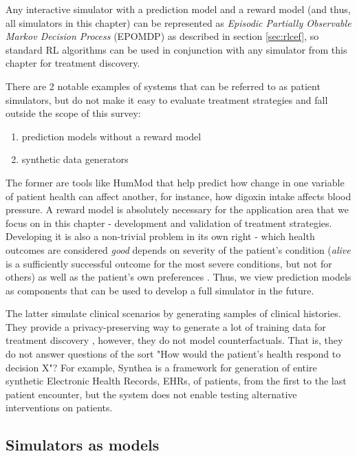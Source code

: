 Any interactive simulator with a prediction model and a reward model (and thus, all simulators in this chapter) can be represented as {\em Episodic Partially Observable Markov Decision Process} (EPOMDP) as described in section \ref{sec:rlcef}, so standard RL algorithms can be used in conjunction with any simulator from this chapter for treatment discovery.

There are 2 notable examples of systems that can be referred to as patient simulators, but do not make it easy to evaluate treatment strategies and fall outside the scope of this survey:
\begin{enumerate}
    \item prediction models without a reward model
    \item synthetic data generators \cite{datagens}
\end{enumerate}

The former are tools like HumMod \cite{hummod} that help predict how change in one variable of patient health can affect another, for instance, how digoxin intake affects blood pressure.
A reward model is absolutely necessary for the application area that we focus on in this chapter - development and validation of treatment strategies.
Developing it is also a non-trivial problem in its own right - which health outcomes are considered \emph{good} depends on severity of the patient's condition (\emph{alive} is a sufficiently successful outcome for the most severe conditions, but not for others) as well as the patient's own preferences \cite{patpreferences1,muhlbacherPatientPreferencesPhysicians2013}.
Thus, we view prediction models as components that can be used to develop a full simulator in the future.

The latter simulate clinical scenarios by generating samples of clinical histories.
They provide a privacy-preserving way to generate a lot of training data for treatment discovery \cite{privacy1,privacy2,privacy3,privacy4}, however, they do not model counterfactuals. That is, they do not answer questions of the sort "How would the patient's health respond to decision X"? For example, Synthea \cite{synthea} is a framework for generation of entire synthetic Electronic Health Records, EHRs, of patients, from the first to the last patient encounter, but the system does not enable testing alternative interventions on patients.

\subsection{Simulators as models}

